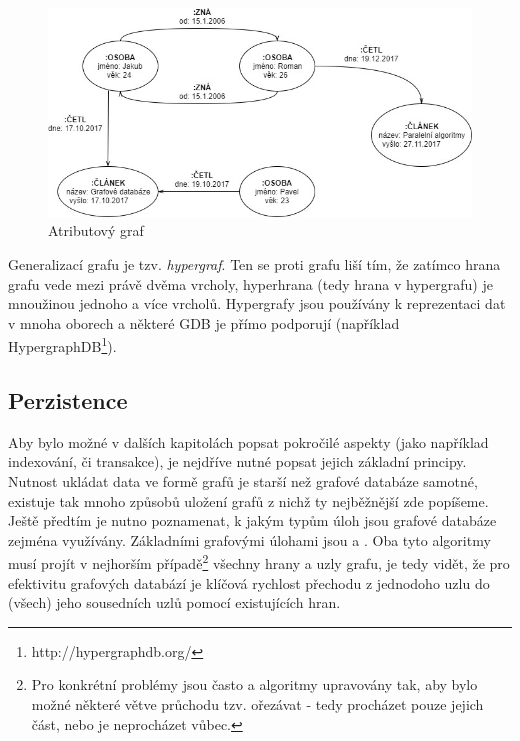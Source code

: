 \begin{figure}
\begin{center}
\includegraphics[width=14cm]{figures/property_graph}
\caption{Atributový graf}
\label{fig:property_graf}
\end{center}
\end{figure}

Generalizací grafu je tzv. \textit{hypergraf}. Ten se proti grafu liší tím, že zatímco hrana grafu vede mezi právě dvěma vrcholy, hyperhrana (tedy hrana v hypergrafu) je mnoužinou jednoho a více vrcholů.\cite{Diestel00} Hypergrafy jsou používány k reprezentaci dat v mnoha oborech a některé GDB je přímo podporují (například HypergraphDB\footnote{http://hypergraphdb.org/}).


\subsection{Perzistence}
Aby bylo možné v dalších kapitolách popsat pokročilé aspekty  (jako například indexování, či transakce), je nejdříve nutné popsat jejich základní principy. Nutnost ukládat data ve formě grafů je starší než grafové databáze samotné, existuje tak mnoho způsobů uložení grafů z nichž ty nejběžnější zde popíšeme. Ještě předtím je nutno poznamenat, k jakým typům úloh jsou grafové databáze zejména využívány. Základními grafovými úlohami jsou  a . Oba tyto algoritmy musí projít v nejhorším případě\footnote{Pro konkrétní problémy jsou často  a  algoritmy upravovány tak, aby bylo možné některé větve průchodu tzv. ořezávat - tedy procházet pouze jejich část, nebo je neprocházet vůbec.} všechny hrany a uzly grafu, je tedy vidět, že pro efektivitu grafových databází je klíčová rychlost přechodu z jednodoho uzlu do (všech) jeho sousedních uzlů pomocí existujících hran.

